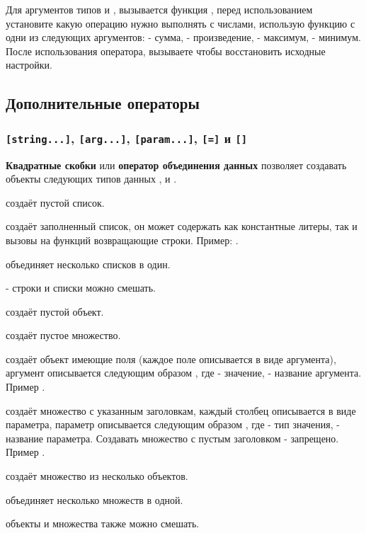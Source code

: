 Для аргументов типов \integer{} и \double{}, вызывается функция , перед использованием установите какую операцию нужно выполнять с числами, использую функцию  с одни из следующих аргументов:  - сумма,  - произведение,  - максимум,  - минимум. После использования оператора, вызываете  чтобы восстановить исходные настройки.

\subsection{Дополнительные операторы}

\subsubsection{\lstinline`[string...]`, \lstinline`[arg...]`, \lstinline`[param...]`, \lstinline`[=]` и \lstinline`[]`}

{\bf Квадратные скобки} или {\bf оператор объединения данных} позволяет создавать объекты следующих типов данных \listtype{}, \set{} и \object{}.

 создаёт пустой список.

 создаёт заполненный список, он может содержать как константные литеры, так и вызовы на функций возвращающие строки. Пример: \code{["a", "b", "c"]}.

 объединяет несколько списков в один.

 - строки и списки можно смешать.

 создаёт пустой объект.

 создаёт пустое множество.

 создаёт объект имеющие поля (каждое поле описывается в виде аргумента), аргумент описывается следующим образом , где  - значение,  - название аргумента. Пример .

 создаёт множество с указанным заголовкам, каждый столбец описывается в виде параметра, параметр описывается следующим образом , где  - тип значения,  - название параметра. Создавать множество с пустым заголовком - запрещено. Пример .

 создаёт множество из несколько объектов.

 объединяет несколько множеств в одной.

 объекты и множества также можно смешать.


